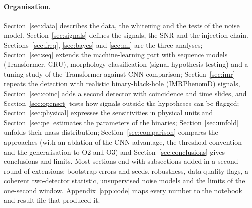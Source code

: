 \paragraph{Organisation.} Section~\ref{sec:data} describes the data, the whitening and the tests of the noise model. Section~\ref{sec:signals} defines the signals, the SNR and the injection chain. Sections~\ref{sec:freq}, \ref{sec:bayes} and \ref{sec:ml}
are the three analyses; Section~\ref{sec:seq} extends the machine-learning part with sequence models (Transformer, GRU), morphology classification (signal hypothesis testing) and a tuning study of the Transformer-against-CNN comparison; Section~\ref{sec:imr} repeats the detection with realistic binary-black-hole (IMRPhenomD) signals, Section~\ref{sec:coinc} adds a second detector with coincidence and time slides, and Section~\ref{sec:openset} tests how signals outside the hypotheses can be flagged; Section~\ref{sec:physical} expresses the sensitivities in physical units and Section~\ref{sec:pe} estimates the parameters of the binaries; Section~\ref{sec:unfold} unfolds their mass distribution; Section~\ref{sec:comparison} compares the approaches (with an ablation of the CNN advantage, the threshold convention and the generalisation to O2 and O3) and Section~\ref{sec:conclusions} gives conclusions and limits. Most sections end with subsections added in a second round of extensions: bootstrap errors and seeds, robustness, data-quality flags, a coherent two-detector statistic, unsupervised noise models and the limits of the one-second window. Appendix~\ref{app:code} maps every number to the notebook and result file that produced it.

